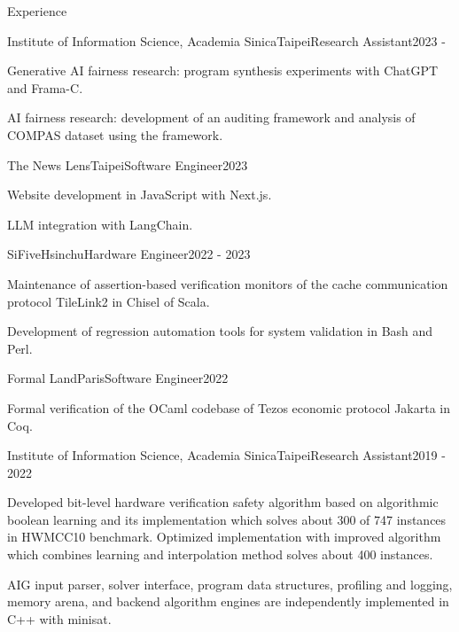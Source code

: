 \documentclass{resume} %
\begin{document}
\begin{rSection}{Experience}

\begin{rSubsection}{Institute of Information Science, Academia Sinica}{Taipei}{Research Assistant}{2023 - }
\item Generative AI fairness research: program synthesis experiments with ChatGPT and Frama-C.
\item AI fairness research: development of an auditing framework and analysis of COMPAS dataset using the framework.
\end{rSubsection}

\begin{rSubsection}{The News Lens}{Taipei}{Software Engineer}{2023}
\item Website development in JavaScript with Next.js.
\item LLM integration with LangChain.
\end{rSubsection}

\begin{rSubsection}{SiFive}{Hsinchu}{Hardware Engineer}{2022 - 2023}
\item Maintenance of assertion-based verification monitors of the cache communication protocol TileLink2 in Chisel of Scala.
\item Development of regression automation tools for system validation in Bash and Perl.
\end{rSubsection}

\begin{rSubsection}{Formal Land}{Paris}{Software Engineer}{2022}
\item Formal verification of the OCaml codebase of Tezos economic protocol Jakarta in Coq.
\end{rSubsection}

\begin{rSubsection}{Institute of Information Science, Academia Sinica}{Taipei}{Research Assistant}{2019 - 2022}
\item Developed bit-level hardware verification safety algorithm based on algorithmic boolean learning and
its implementation which solves about 300 of 747 instances in HWMCC10 benchmark.
Optimized implementation with improved algorithm which combines learning and interpolation method solves about 400 instances.
\item AIG input parser, solver interface, program data structures, profiling and logging,
memory arena, and backend algorithm engines are independently implemented in C++ with minisat.
\end{rSubsection}


\end{rSection}
\end{document}
